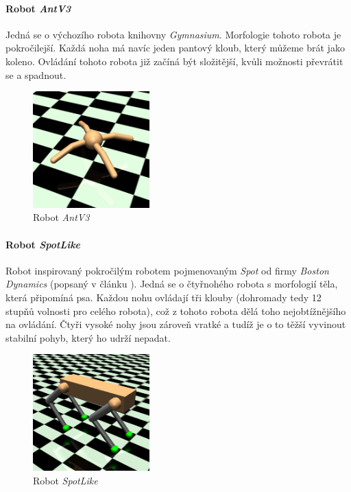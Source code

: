 \paragraph{Robot \emph{AntV3}} \label{imp:robots.Ant}
Jedná se o výchozího robota knihovny \emph{Gymnasium}. Morfologie
tohoto robota je pokročilejší. Každá noha má navíc jeden pantový kloub, který
můžeme brát jako koleno. Ovládání tohoto robota již začíná být složitější,
kvůli možnosti převrátit se a spadnout.
\begin{figure}[!htb]
    \centering
    \includegraphics[width=0.4\textwidth]{../img/crop_Ant-v3.jpg}
    \caption{Robot \emph{AntV3}}
\end{figure}

\paragraph{Robot \emph{SpotLike}} \label{imp:robots.Spot}
Robot inspirovaný pokročilým robotem pojmenovaným \emph{Spot} od firmy
\emph{Boston Dynamics} (popsaný v článku \citep{guizzo2019leaps}). Jedná se o
čtyřnohého robota s morfologií těla, která připomíná psa. Každou nohu ovládají
tři klouby (dohromady tedy 12 stupňů volnosti pro celého robota), což z tohoto
robota dělá toho nejobtížnějšího na ovládání. Čtyři vysoké nohy jsou zároveň
vratké a tudíž je o to těžší vyvinout stabilní pohyb, který ho udrží nepadat.

\begin{figure}[!htb]
    \centering
    \includegraphics[width=0.4\textwidth]{../img/crop_SpotLike.jpg}
    \caption{Robot \emph{SpotLike}}
\end{figure}

